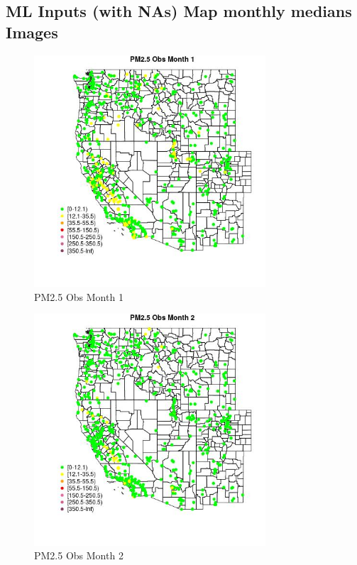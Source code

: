 
\subsection{ML Inputs (with NAs) Map monthly medians Images} 
 

\begin{figure} 
\centering  
\includegraphics[width=0.77\textwidth]{Code_Outputs/Report_ML_input_PM25_Step4_part_e_de_duplicated_aves_compiled_2019-05-21wNAs_MapObsMo1PM25_Obs.jpg} 
\caption{\label{fig:Report_ML_input_PM25_Step4_part_e_de_duplicated_aves_compiled_2019-05-21wNAsMapObsMo1PM25_Obs}PM2.5 Obs Month 1} 
\end{figure} 
 

\begin{figure} 
\centering  
\includegraphics[width=0.77\textwidth]{Code_Outputs/Report_ML_input_PM25_Step4_part_e_de_duplicated_aves_compiled_2019-05-21wNAs_MapObsMo2PM25_Obs.jpg} 
\caption{\label{fig:Report_ML_input_PM25_Step4_part_e_de_duplicated_aves_compiled_2019-05-21wNAsMapObsMo2PM25_Obs}PM2.5 Obs Month 2} 
\end{figure} 
 

